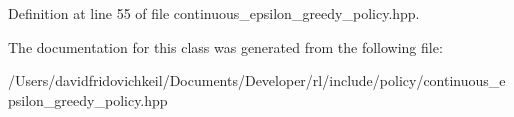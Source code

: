 Definition at line 55 of file continuous\+\_\+epsilon\+\_\+greedy\+\_\+policy.\+hpp.



The documentation for this class was generated from the following file\+:\begin{DoxyCompactItemize}
\item 
/\+Users/davidfridovichkeil/\+Documents/\+Developer/rl/include/policy/continuous\+\_\+epsilon\+\_\+greedy\+\_\+policy.\+hpp\end{DoxyCompactItemize}
